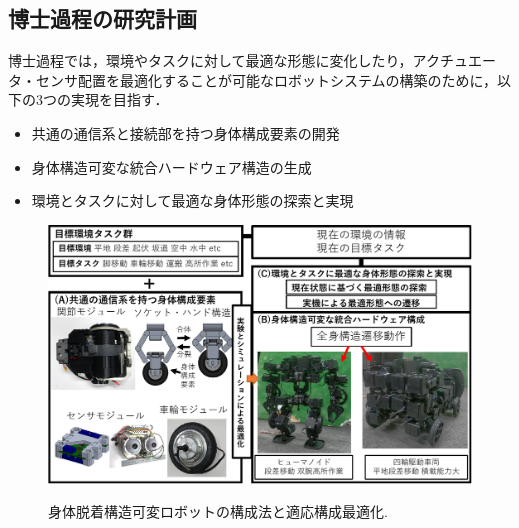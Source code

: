 \documentclass[twocolumn]{d-abst}
\begin{document}
\subsection{博士過程の研究計画}
博士過程では，環境やタスクに対して最適な形態に変化したり，アクチュエータ・センサ配置を最適化することが可能なロボットシステムの構築のために，以下の3つの実現を目指す．
\begin{itemize}
\item 共通の通信系と接続部を持つ身体構成要素の開発
\item 身体構造可変な統合ハードウェア構造の生成
\item 環境とタスクに対して最適な身体形態の探索と実現
\end{itemize}

\begin{figure}[tbh]
 \begin{center}
  \begin{minipage}{1.0\columnwidth}
    \includegraphics[width=\columnwidth]{4_matome.pdf}
   \caption{身体脱着構造可変ロボットの構成法と適応構成最適化.}
  \end{minipage}
  \label{figure:nowprinting}
 \end{center}
\end{figure}
\end{document}
